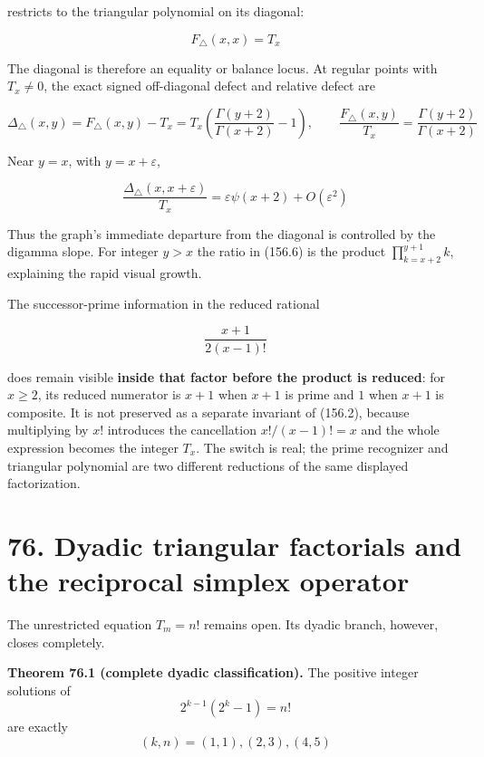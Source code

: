 \documentclass[
  11pt,
]{book}
\renewenvironment{quote}
  {\begin{tcolorbox}[
      enhanced,
      breakable,
      colback=tncream,
      colframe=tnrust,
      boxrule=0.8pt,
      arc=1.5pt,
      left=7pt,
      right=7pt,
      top=6pt,
      bottom=6pt]}
  {\end{tcolorbox}}
\begin{document}
restricts to the triangular polynomial on its diagonal:

\[
\boxed{F_\triangle(x,x)=T_x}
\tag{156.5}
\]

The diagonal is therefore an equality or balance locus. At regular
points with \(T_x\ne0\), the exact signed off-diagonal defect and
relative defect are

\[
\boxed{
\Delta_\triangle(x,y)
=F_\triangle(x,y)-T_x
=T_x\left(\frac{\Gamma(y+2)}{\Gamma(x+2)}-1\right),\qquad
\frac{F_\triangle(x,y)}{T_x}
=\frac{\Gamma(y+2)}{\Gamma(x+2)}}
\tag{156.6}
\]

Near \(y=x\), with \(y=x+\varepsilon\),

\[
\frac{\Delta_\triangle(x,x+\varepsilon)}{T_x}
=\varepsilon\psi(x+2)+O(\varepsilon^2)
\tag{156.7}
\]

Thus the graph's immediate departure from the diagonal is controlled by
the digamma slope. For integer \(y>x\) the ratio in (156.6) is the
product \(\prod_{k=x+2}^{y+1}k\), explaining the rapid visual growth.

The successor-prime information in the reduced rational

\[
\frac{x+1}{2(x-1)!}
\tag{156.8}
\]

does remain visible \textbf{inside that factor before the product is
reduced}: for \(x\ge2\), its reduced numerator is \(x+1\) when \(x+1\)
is prime and \(1\) when \(x+1\) is composite. It is not preserved as a
separate invariant of (156.2), because multiplying by \(x!\) introduces
the cancellation \(x!/(x-1)!=x\) and the whole expression becomes the
integer \(T_x\). The switch is real; the prime recognizer and triangular
polynomial are two different reductions of the same displayed
factorization.

\section{76. Dyadic triangular factorials and the reciprocal simplex
operator}\label{dyadic-triangular-factorials-and-the-reciprocal-simplex-operator}

The unrestricted equation \(T_m=n!\) remains open. Its dyadic branch,
however, closes completely.

\begin{quote}
\textbf{Theorem 76.1 (complete dyadic classification).} The positive
integer solutions of \[
2^{k-1}(2^k-1)=n!
\tag{76.1}
\] are exactly \[
\boxed{(k,n)=(1,1),(2,3),(4,5)}
\tag{76.2}
\]
\end{quote}
\end{document}
